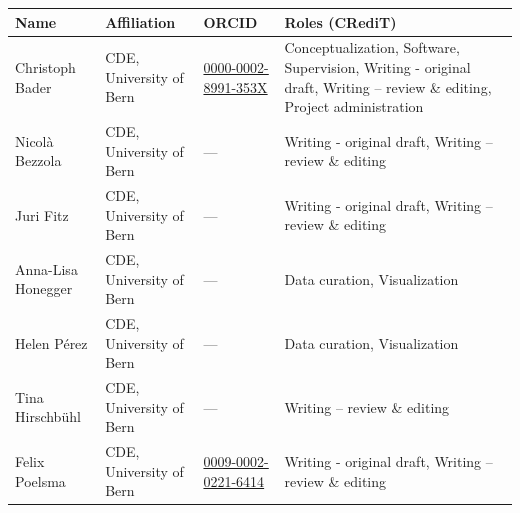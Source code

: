 \documentclass[
  a4paper,
  openany]{book}
\begin{document}
\begin{tcolorbox}[enhanced jigsaw, coltitle=black, bottomtitle=1mm, opacitybacktitle=0.6, titlerule=0mm, opacityback=0, leftrule=.75mm, colbacktitle=quarto-callout-note-color!10!white, bottomrule=.15mm, toptitle=1mm, breakable, title={Contribution Matrix (CRediT Taxonomy)}, arc=.35mm, rightrule=.15mm, toprule=.15mm, left=2mm, colback=white, colframe=quarto-callout-note-color-frame]

\begin{longtable}[]{@{}
  >{\raggedright\arraybackslash}p{}
  >{\raggedright\arraybackslash}p{}
  >{\raggedright\arraybackslash}p{}
  >{\raggedright\arraybackslash}p{}@{}}
\toprule\noalign{}
\begin{minipage}[b]{\linewidth}\raggedright
Name
\end{minipage} & \begin{minipage}[b]{\linewidth}\raggedright
Affiliation
\end{minipage} & \begin{minipage}[b]{\linewidth}\raggedright
ORCID
\end{minipage} & \begin{minipage}[b]{\linewidth}\raggedright
Roles (CRediT)
\end{minipage} \\
\midrule\noalign{}
\endhead
\bottomrule\noalign{}
\endlastfoot
Christoph Bader & CDE, University of Bern &
\href{https://orcid.org/0000-0002-8991-353X}{0000-0002-8991-353X} &
Conceptualization, Software, Supervision, Writing - original draft,
Writing -- review \& editing, Project administration \\
Nicolà Bezzola & CDE, University of Bern & --- & Writing - original
draft, Writing -- review \& editing \\
Juri Fitz & CDE, University of Bern & --- & Writing - original draft,
Writing -- review \& editing \\
Anna-Lisa Honegger & CDE, University of Bern & --- & Data curation,
Visualization \\
Helen Pérez & CDE, University of Bern & --- & Data curation,
Visualization \\
Tina Hirschbühl & CDE, University of Bern & --- & Writing -- review \&
editing \\
Felix Poelsma & CDE, University of Bern &
\href{https://orcid.org/0009-0002-0221-6414}{0009-0002-0221-6414} &
Writing - original draft, Writing -- review \& editing \\
\end{longtable}

\end{tcolorbox}
\end{document}
